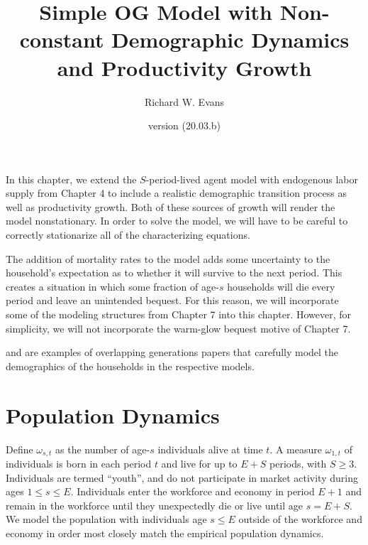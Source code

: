 \documentclass[letterpaper,12pt]{article}
\theoremstyle{definition}
\begin{document}
\title{Simple OG Model with Non-constant Demographic Dynamics and Productivity Growth}
\date{version (20.03.b)}
\author{Richard W. Evans}
\maketitle



In this chapter, we extend the $S$-period-lived agent model with endogenous labor supply from Chapter 4 to include a realistic demographic transition process as well as productivity growth. Both of these sources of growth will render the model nonstationary. In order to solve the model, we will have to be careful to correctly stationarize all of the characterizing equations.

The addition of mortality rates to the model adds some uncertainty to the household's expectation as to whether it will survive to the next period. This creates a situation in which some fraction of age-$s$ households will die every period and leave an unintended bequest. For this reason, we will incorporate some of the modeling structures from Chapter 7 into this chapter. However, for simplicity, we will not incorporate the warm-glow bequest motive of Chapter 7.

\citet{Nishiyama:2015} and \citet{DeBackerEtAl:2019} are examples of overlapping generations papers that carefully model the demographics of the households in the respective models.


\section{Population Dynamics}\label{SecPopDyn}

  Define $\omega_{s,t}$ as the number of age-$s$ individuals alive at time $t$. A measure $\omega_{1,t}$ of individuals is born in each period $t$ and live for up to $E+S$ periods, with $S\geq 3$. Individuals are termed ``youth'', and do not participate in market activity during ages $1\leq s\leq E$. Individuals enter the workforce and economy in period $E+1$ and remain in the workforce until they unexpectedly die or live until age $s=E+S$. We model the population with individuals age $s\leq E$ outside of the workforce and economy in order most closely match the empirical population dynamics.
\end{document}
